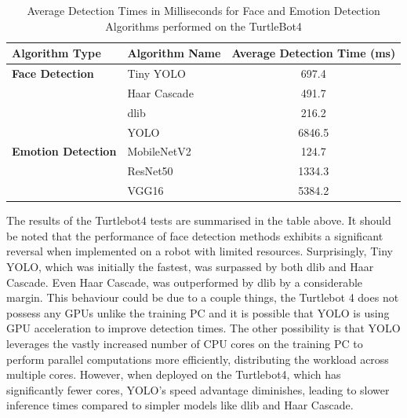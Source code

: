 \begin{table}[h!]
\centering{}
\caption{Average Detection Times in Milliseconds for Face and Emotion Detection Algorithms performed on the TurtleBot4}
\begin{tabular}{|l|l|c|}
\hline
\textbf{Algorithm Type} & \textbf{Algorithm Name} & \textbf{Average Detection Time (ms)} \\ \hline
\textbf{Face Detection} & Tiny YOLO               & 697.4                                \\ \cline{2-3}
                        & Haar Cascade            & 491.7                                \\ \cline{2-3}
                        & dlib                    & 216.2                                \\ \cline{2-3}
                        & YOLO                    & 6846.5                               \\ \hline
\textbf{Emotion Detection} & MobileNetV2          & 124.7                                \\ \cline{2-3}
                        & ResNet50                & 1334.3                               \\ \cline{2-3}
                        & VGG16                   & 5384.2                               \\ \hline
\end{tabular}
\label{tab:algorithm_detection_times_ms_robot}
\end{table}

The results of the Turtlebot4 tests are summarised in the table above. It should be noted that the performance of face detection methods exhibits a significant reversal when implemented on a robot with limited resources. Surprisingly, Tiny YOLO, which was initially the fastest, was surpassed by both dlib and Haar Cascade. Even Haar Cascade, was outperformed by dlib by a considerable margin. This behaviour could be due to a couple things, the Turtlebot 4 does not possess any GPUs unlike the training PC and it is possible that YOLO is using GPU acceleration to improve detection times. The other possibility is that YOLO leverages the vastly increased number of CPU cores on the training PC to perform parallel computations more efficiently, distributing the workload across multiple cores. However, when deployed on the Turtlebot4, which has significantly fewer cores, YOLO's speed advantage diminishes, leading to slower inference times compared to simpler models like dlib and Haar Cascade.

